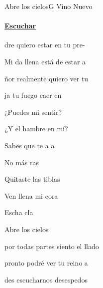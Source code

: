 \documentclass[12pt, spanish]{book}
\newcommand{\NotCCLIed}{\relax}
\begin{document}
    \begin{song}{Abre los cielos}{G}
    {} %
    {Vino Nuevo}
    {} %
    {} %
        \ifChordBk
        \paragraph{\mbox{}\hfill\protect\href{https://open.spotify.com/intl-es/track/2QiEyadlnzt9lqDXfntwKj}{Escuchar}\mbox{}\hfill}
        \fi



        \begin{SBOpGroup}
            dre quiero estar en tu pre-

            Mi da llena está de estar a

            ñor realmente quiero ver tu 

            ja tu fuego  caer en 
        \end{SBOpGroup}

        \begin{SBChorus}
            ¿Puedes mi  sentir?

            ¿Y el hambre  en mí?

            Sabes que te a a ~

            No más ras

            Quitaste las tiblas

            Ven llena  mi cora

            Escha  cla

            Abre los cielos 
        \end{SBChorus}


        \begin{SBOpGroup}
             por todas partes siento el llado

             pronto podré ver tu reino a

            des escucharnos desespedos


\end{SBOpGroup}
\end{song}
\end{document}
